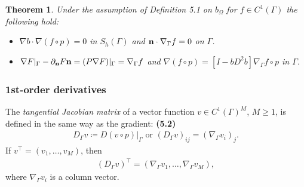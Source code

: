\documentclass[oneside]{book}
\numberwithin{equation}{section}
\newtheorem{theorem}{Theorem}[section]
\begin{document}
\begin{theorem}
    Under the assumption of Definition 5.1 on $b_\Omega$ for $f\in C^1(\Gamma)$ the following hold:
    \begin{itemize}
        \item[(i)] $\nabla b\cdot\nabla(f\circ p) = 0$ in $S_h(\Gamma)$ and ${\bf n}\cdot\nabla_\Gamma f = 0$ on $\Gamma$.
        \item[(ii)] $\nabla F|_\Gamma - \partial_{\bf n}F{\bf n} = (P\nabla F)|_\Gamma = \nabla_\Gamma f$ and $\nabla(f\circ p) = [I - bD^2b]\nabla_\Gamma f\circ p$ in $\Gamma$.
    \end{itemize}
\end{theorem}

\subsubsection{1st-order derivatives}
The \textit{tangential Jacobian matrix} of a vector function $v\in C^1(\Gamma)^M$, $M\ge 1$, is defined in the same way as the gradient: \textbf{(5.2)}
\begin{align*}
    D_\Gamma v\coloneqq D(v\circ p)|_\Gamma \mbox{ or } (D_\Gamma v)_{ij} = (\nabla_\Gamma v_i)_j.
\end{align*}
If $v^\top = (v_1,\ldots,v_M)$, then
\begin{align*}
    (D_\Gamma v)^\top = \left(\nabla_\Gamma v_1,\ldots,\nabla_\Gamma v_M\right),
\end{align*}
where $\nabla_\Gamma v_i$ is a column vector.
\end{document}

